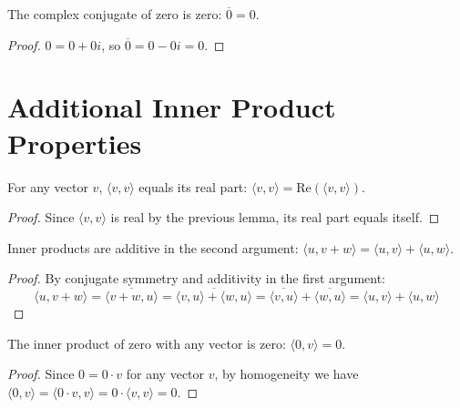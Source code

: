 \begin{lemma}
  \label{lemma : conj_zero}
  \leanok
  The complex conjugate of zero is zero: $\overline{0} = 0$.
\end{lemma}
\begin{proof}
  $0 = 0 + 0i$, so $\overline{0} = 0 - 0i = 0$.
\end{proof}

\section{Additional Inner Product Properties}

\begin{lemma}
  \label{lemma : inner_self_re}
  \leanok
  For any vector $v$, $\langle v, v \rangle$ equals its real part: $\langle v, v \rangle = \text{Re}(\langle v, v \rangle)$.
\end{lemma}
\begin{proof}
  Since $\langle v, v \rangle$ is real by the previous lemma, its real part equals itself.
\end{proof}

\begin{lemma}
  \label{lemma : inner_add_right}
  \leanok
  Inner products are additive in the second argument: $\langle u, v + w \rangle = \langle u, v \rangle + \langle u, w \rangle$.
\end{lemma}
\begin{proof}
  By conjugate symmetry and additivity in the first argument:
  $$\langle u, v + w \rangle = \overline{\langle v + w, u \rangle} = \overline{\langle v, u \rangle + \langle w, u \rangle} = \overline{\langle v, u \rangle} + \overline{\langle w, u \rangle} = \langle u, v \rangle + \langle u, w \rangle$$
\end{proof}

\begin{lemma}
  \label{lemma : inner_zero_left}
  \leanok
  The inner product of zero with any vector is zero: $\langle 0, v \rangle = 0$.
\end{lemma}
\begin{proof}
  Since $0 = 0 \cdot v$ for any vector $v$, by homogeneity we have $\langle 0, v \rangle = \langle 0 \cdot v, v \rangle = 0 \cdot \langle v, v \rangle = 0$.
\end{proof}


